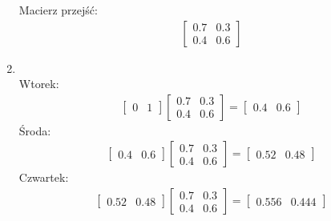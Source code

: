 \documentclass[main.tex]{subfiles}
\begin{document}
\begin{enumerate}
\begin{center}
            Macierz przejść:
            \begin{align*}
                \begin{bmatrix}
                    0.7 & 0.3\\
                    0.4 & 0.6
                \end{bmatrix}
            \end{align*}
        \end{center}
        \item \hfill \\
        Wtorek:
        \begin{align*}
            \begin{bmatrix}
                0 & 1
            \end{bmatrix}
            \begin{bmatrix}
                0.7 & 0.3\\
                0.4 & 0.6
            \end{bmatrix}
            =
            \begin{bmatrix}
                0.4 & 0.6
            \end{bmatrix}
        \end{align*}
        Środa:
        \begin{align*}
            \begin{bmatrix}
                0.4 & 0.6
            \end{bmatrix}
            \begin{bmatrix}
                0.7 & 0.3\\
                0.4 & 0.6
            \end{bmatrix}
            =
            \begin{bmatrix}
                0.52 & 0.48
            \end{bmatrix}
        \end{align*}
        Czwartek:
        \begin{align*}
            \begin{bmatrix}
                0.52 & 0.48
            \end{bmatrix}
            \begin{bmatrix}
                0.7 & 0.3\\
                0.4 & 0.6
            \end{bmatrix}
            =
            \begin{bmatrix}
                0.556 & 0.444
            \end{bmatrix}

\end{align*}
\end{enumerate}
\end{document}
